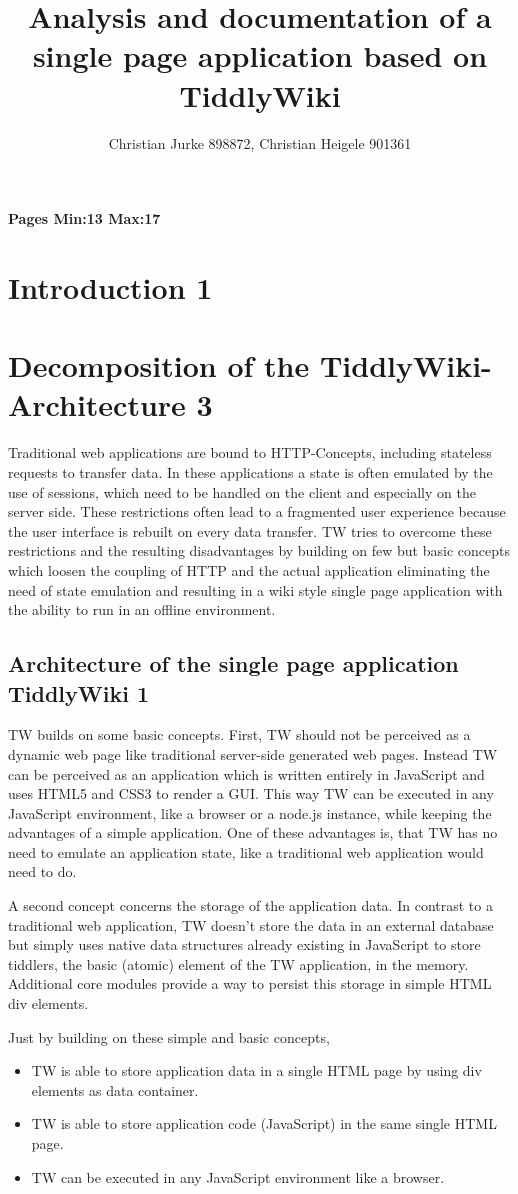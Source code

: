 \documentclass[12pt,a4paper]{article}
\title{Analysis and documentation of a single page application based on TiddlyWiki}
\author{Christian Jurke 898872, Christian Heigele 901361}
\begin{document}
\maketitle
\tableofcontents
\textbf{Pages Min:13 Max:17 }
\section{Introduction 1}
\section{Decomposition of the TiddlyWiki-Architecture 3}
Traditional web applications are bound to HTTP-Concepts, including stateless requests to transfer data. In these applications a state is often emulated by the use of sessions, which need to be handled on the client and especially on the server side.
These restrictions often lead to a fragmented user experience because the user interface is rebuilt on every data transfer.
TW tries to overcome these restrictions and the resulting disadvantages by building on few but basic concepts which loosen the coupling of HTTP and the actual application eliminating the need of state emulation and resulting in a wiki style single page application with the ability to run in an offline environment.
\subsection{Architecture of the single page application TiddlyWiki 1}
TW builds on some basic concepts. First, TW should not be perceived as a dynamic web page like traditional server-side generated web pages. Instead TW can be perceived as an application which is written entirely in JavaScript and uses HTML5 and CSS3 to render a GUI. This way TW can be executed in any JavaScript environment, like a browser or a node.js instance, while keeping the advantages of a simple application.
One of these advantages is, that TW has no need to emulate an application state, like a traditional web application would need to do.

A second concept concerns the storage of the application data. In contrast to a traditional web application, TW doesn't store the data in an external database but simply uses native data structures already existing in JavaScript to store tiddlers, the basic (atomic) element of the TW application, in the memory. Additional core modules provide a way to persist this storage in simple HTML div elements.

Just by building on these simple and basic concepts,
\begin{itemize}
\item TW is able to store application data in a single HTML page by using div elements as data container.
\item TW is able to store application code (JavaScript) in the same single HTML page.
\item TW can be executed in any JavaScript environment like a browser.
\end{itemize}
\end{document}
